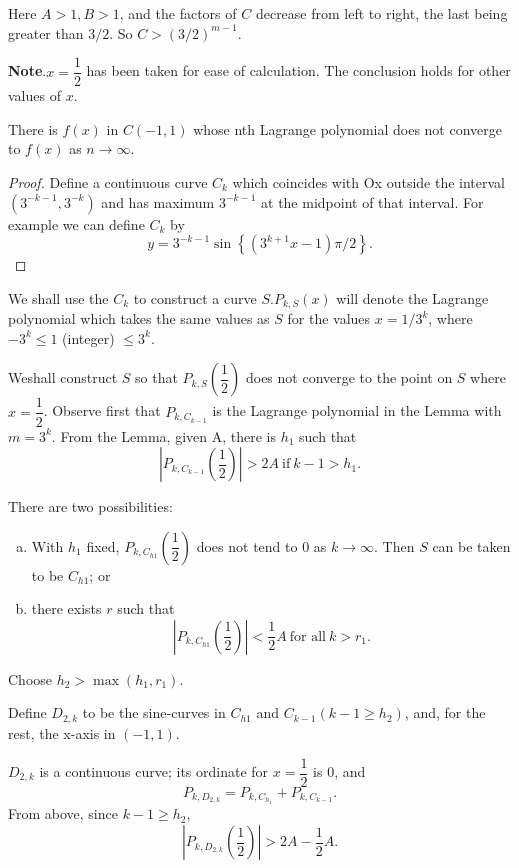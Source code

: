 Here $A>1,B>1$, and the factors of $C$ decrease from left to right,
the last being greater than $3/2$. So $C> (3/2)^{m-1}$.  

\noindent
\textbf{Note}.$x = \dfrac{1}{2}$ has been taken for ease of
calculation. The conclusion holds for other values of $x$. 

\begin{theorem}[Borel]\label{chap5:sec14:thm24} %
  There is $f(x)$ in $C(-1,1)$ whose nth Lagrange polynomial
  does not converge to $f(x) $ as $n \to \infty$. 
\end{theorem}

\begin{proof}
  Define a continuous curve $C_k$ which coincides with Ox outside the
  interval $(3^{-k-1}, 3^{-k})$ and has maximum $3^{-k-1}$ at the
  midpoint of that interval. For example we can define $C_k$ by  
  $$
  y = 3^{-k-1} \sin \left\{(3^{k+1} x-1) \pi/2 \right\}.
  $$
\end{proof}

We shall use the $C_k$ to construct a curve $S. P_{k,S}(x)$ will
denote the Lagrange polynomial which takes the same values as $S$ for
the values $x = 1/3^k$, where $-3^k \leq 1$ (integer) $\leq{3^k}$. 

We\pageoriginale shall construct $S$ so that $P_{k,S} \left(\dfrac{1}{2}\right)$ does not
converge to the point on $S$ where $x = \dfrac{1}{2}$. Observe first
that $P_{k,C_{k-1}}$ is the Lagrange polynomial in the Lemma with $m =
3^k$. From the Lemma, given A, there is $h_1$ such that  
$$
|P_{k,C_{k-1}}\left(\frac{1}{2}\right)| > 2 A ~\text{if}~ k-1 > h_1.
$$

There are two possibilities:
\begin{enumerate}[(a)]
\item With $h_1$ fixed, $P_{k,C_{h1}}\left(\dfrac{1}{2}\right)$ does not tend to
  $0$ as $k \to \infty$. Then $S$ can be taken to be $C_{h1}$; or  
\item there exists $r$ such that 
  $$
  |P_{k,C_{h1}}\left(\frac{1}{2}\right)| < \frac{1}{2} A ~\text{for all}~ k> r_1.
  $$
\end{enumerate}
Choose $h_2 > \max(h_1,r_1)$.

Define $D_{2,k}$ to be the sine-curves in $C_{h1}$ and $C_{k-1} (k-1
\geq h_2)$, and, for the rest, the x-axis in $(-1,1)$. 

$D_{2,k}$ is a continuous curve; its ordinate for $x = \dfrac{1}{2}$ is
$0$, and  
$$
P_{k,D_{2,k}} = P_{k,C_{h_1}} + P_{k,C_{k-1}}.
$$
From above, since $k-1 \geq h_2$,
$$
|P_{k,D_{2,k}}\left(\frac{1}{2}\right)| > 2 A - \frac{1}{2}A.
$$

